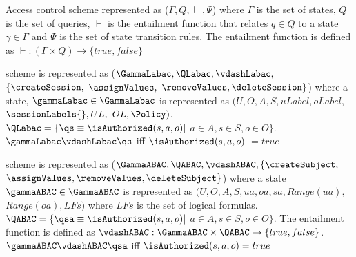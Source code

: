 
%
%

Access control scheme represented as ($\Gamma, Q, \vdash, \Psi$)  where $\Gamma$ is the set of states, $Q$ is the set of queries,  $\vdash$ is the entailment function that relates $q\in Q$  to a state $\gamma \in \Gamma$ and $\Psi$ is the set of state transition rules. The entailment function is defined as  $\vdash: (\Gamma \times Q) \to \{true, false\}$

\clabac{} scheme is represented as ($\GammaLabac, \QLabac, \vdashLabac,$  $\{\createSession,$ $ \assignValues,$ $ \removeValues, \deleteSession\}$) where a state,  $ \gammaLabac \in \GammaLabac$ is represented as $(U, O, A, S, uLabel, oLabel,$ $ \sessionLabels{},  UL,$  $ OL, \Policy)$. $\QLabac=\{ \qs \equiv \isAuthorized(s, a, o)|$  $ a\in A, s \in S, o \in O \}$. $\gammaLabac \vdashLabac \qs$ iff $\isAuthorized(s,a,o)$ $=true$

\abacOneOne{} scheme is represented as ($\GammaABAC, \QABAC, \vdashABAC, \{ \createSubject, $ $ \assignValues, \removeValues, \deleteSubject \}$) where a state $\gammaABAC \in \GammaABAC$ is represented as $(U, O, A, S, ua, oa, sa, Range(ua),$  $ Range(oa), LFs)$ where $LFs$ is the set of logical formulas.  $\QABAC=\{ \qsa \equiv \isAuthorized(s, a, o)|$  $ a\in A, s \in S, o  \in O \}$. The entailment function is defined as  $\vdashABAC: \GammaABAC \times \QABAC \to \{true, false\}$. $\gammaABAC \vdashABAC \qsa$ iff $\isAuthorized(s,a,o)=true$


